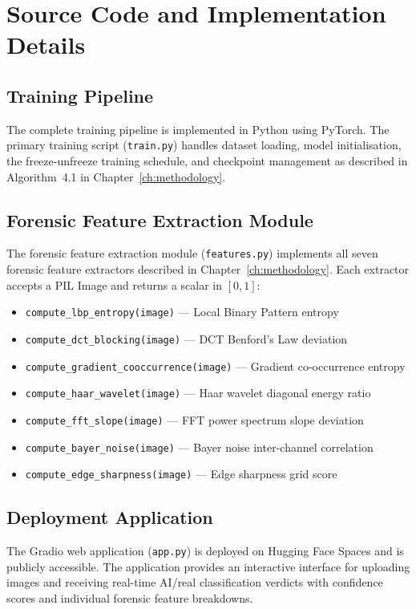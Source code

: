 \chapter{Source Code and Implementation Details}

\section{Training Pipeline}

The complete training pipeline is implemented in Python using PyTorch. The primary training script (\texttt{train.py}) handles dataset loading, model initialisation, the freeze-unfreeze training schedule, and checkpoint management as described in Algorithm~4.1 in Chapter~\ref{ch:methodology}.

\section{Forensic Feature Extraction Module}

The forensic feature extraction module (\texttt{features.py}) implements all seven forensic feature extractors described in Chapter~\ref{ch:methodology}. Each extractor accepts a PIL Image and returns a scalar in $[0, 1]$:

\begin{itemize}
    \item \texttt{compute\_lbp\_entropy(image)} --- Local Binary Pattern entropy
    \item \texttt{compute\_dct\_blocking(image)} --- DCT Benford's Law deviation
    \item \texttt{compute\_gradient\_cooccurrence(image)} --- Gradient co-occurrence entropy
    \item \texttt{compute\_haar\_wavelet(image)} --- Haar wavelet diagonal energy ratio
    \item \texttt{compute\_fft\_slope(image)} --- FFT power spectrum slope deviation
    \item \texttt{compute\_bayer\_noise(image)} --- Bayer noise inter-channel correlation
    \item \texttt{compute\_edge\_sharpness(image)} --- Edge sharpness grid score
\end{itemize}

\section{Deployment Application}

The Gradio web application (\texttt{app.py}) is deployed on Hugging Face Spaces and is publicly accessible. The application provides an interactive interface for uploading images and receiving real-time AI/real classification verdicts with confidence scores and individual forensic feature breakdowns.

